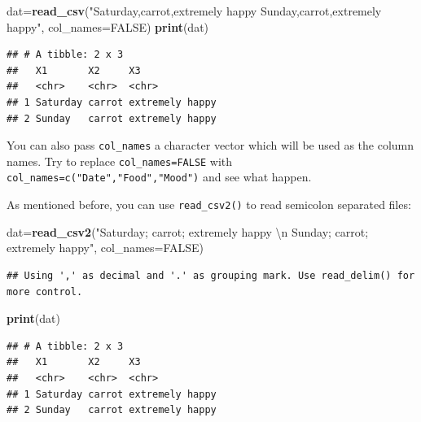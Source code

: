 \documentclass[12pt,]{krantz}
\newenvironment{Shaded}{\begin{snugshade}}{\end{snugshade}}
\newcommand{\KeywordTok}[1]{\textcolor[rgb]{0.13,0.29,0.53}{\textbf{#1}}}
\newcommand{\DataTypeTok}[1]{\textcolor[rgb]{0.13,0.29,0.53}{#1}}
\newcommand{\CharTok}[1]{\textcolor[rgb]{0.31,0.60,0.02}{#1}}
\newcommand{\StringTok}[1]{\textcolor[rgb]{0.31,0.60,0.02}{#1}}
\newcommand{\OtherTok}[1]{\textcolor[rgb]{0.56,0.35,0.01}{#1}}
\newcommand{\NormalTok}[1]{#1}
\theoremstyle{definition}
\theoremstyle{definition}
\theoremstyle{definition}
\theoremstyle{remark}
\begin{document}
\begin{Shaded}
\begin{Highlighting}[]
\NormalTok{dat=}\KeywordTok{read_csv}\NormalTok{(}\StringTok{"Saturday,carrot,extremely happy}
\StringTok{          Sunday,carrot,extremely happy"}\NormalTok{, }\DataTypeTok{col_names=}\OtherTok{FALSE}\NormalTok{)}
\KeywordTok{print}\NormalTok{(dat)}
\end{Highlighting}
\end{Shaded}

\begin{verbatim}
## # A tibble: 2 x 3
##   X1       X2     X3             
##   <chr>    <chr>  <chr>          
## 1 Saturday carrot extremely happy
## 2 Sunday   carrot extremely happy
\end{verbatim}

You can also pass \texttt{col\_names} a character vector which will be
used as the column names. Try to replace \texttt{col\_names=FALSE} with
\texttt{col\_names=c("Date","Food","Mood")} and see what happen.

As mentioned before, you can use \texttt{read\_csv2()} to read semicolon
separated files:

\begin{Shaded}
\begin{Highlighting}[]
\NormalTok{dat=}\KeywordTok{read_csv2}\NormalTok{(}\StringTok{"Saturday; carrot; extremely happy }\CharTok{\textbackslash{}n}\StringTok{ Sunday; carrot; extremely happy"}\NormalTok{, }\DataTypeTok{col_names=}\OtherTok{FALSE}\NormalTok{)}
\end{Highlighting}
\end{Shaded}

\begin{verbatim}
## Using ',' as decimal and '.' as grouping mark. Use read_delim() for more control.
\end{verbatim}

\begin{Shaded}
\begin{Highlighting}[]
\KeywordTok{print}\NormalTok{(dat)}
\end{Highlighting}
\end{Shaded}

\begin{verbatim}
## # A tibble: 2 x 3
##   X1       X2     X3             
##   <chr>    <chr>  <chr>          
## 1 Saturday carrot extremely happy
## 2 Sunday   carrot extremely happy
\end{verbatim}
\end{document}
